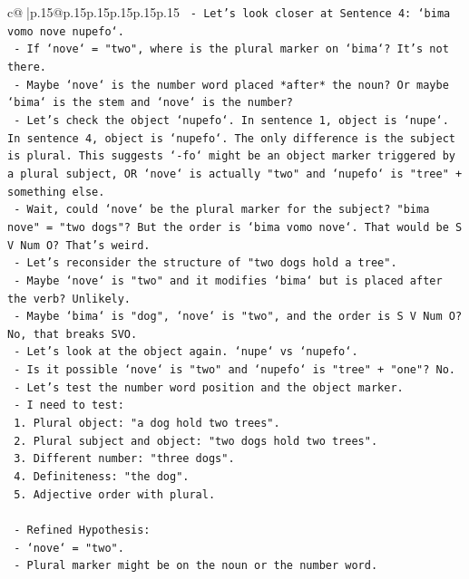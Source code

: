 \documentclass{article}
\begin{document}
{\begin{supertabular}{c@{$\;$}|p{.15\linewidth}@{}p{.15\linewidth}p{.15\linewidth}p{.15\linewidth}p{.15\linewidth}p{.15\linewidth}}
{{{\texttt{   {-} Let's look closer at Sentence 4: `bima vomo nove nupefo`.} \\
\texttt{     {-} If `nove` = "two", where is the plural marker on `bima`? It's not there.} \\
\texttt{     {-} Maybe `nove` is the number word placed *after* the noun? Or maybe `bima` is the stem and `nove` is the number?} \\
\texttt{     {-} Let's check the object `nupefo`. In sentence 1, object is `nupe`. In sentence 4, object is `nupefo`. The only difference is the subject is plural. This suggests `{-}fo` might be an object marker triggered by a plural subject, OR `nove` is actually "two" and `nupefo` is "tree" + something else.} \\
\texttt{     {-} Wait, could `nove` be the plural marker for the subject? "bima nove" = "two dogs"? But the order is `bima vomo nove`. That would be S V Num O? That's weird.} \\
\texttt{     {-} Let's reconsider the structure of "two dogs hold a tree".} \\
\texttt{     {-} Maybe `nove` is "two" and it modifies `bima` but is placed after the verb? Unlikely.} \\
\texttt{     {-} Maybe `bima` is "dog", `nove` is "two", and the order is S V Num O? No, that breaks SVO.} \\
\texttt{     {-} Let's look at the object again. `nupe` vs `nupefo`.} \\
\texttt{     {-} Is it possible `nove` is "two" and `nupefo` is "tree" + "one"? No.} \\
\texttt{     {-} Let's test the number word position and the object marker.} \\
\texttt{     {-} I need to test:} \\
\texttt{       1. Plural object: "a dog hold two trees".} \\
\texttt{       2. Plural subject and object: "two dogs hold two trees".} \\
\texttt{       3. Different number: "three dogs".} \\
\texttt{       4. Definiteness: "the dog".} \\
\texttt{       5. Adjective order with plural.} \\
\\ 
\texttt{   {-} Refined Hypothesis:} \\
\texttt{     {-} `nove` = "two".} \\
\texttt{     {-} Plural marker might be on the noun or the number word.} \\
}}}
\end{supertabular}}
\end{document}
